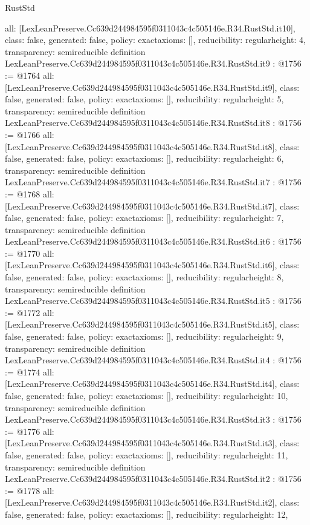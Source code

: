 \begin{lexlean}{RustStd}
\begin{coremodule}
{  all: [LexLeanPreserve.Cc639d244984595f0311043c4c505146e.R34.RustStd.it10],
  class: false,
  generated: false,
  policy: exact{axioms: []},
  reducibility: regular{height: 4},
  transparency: semireducible
}
definition LexLeanPreserve.Cc639d244984595f0311043c4c505146e.R34.RustStd.it9 : @1756 := @1764 {
  all: [LexLeanPreserve.Cc639d244984595f0311043c4c505146e.R34.RustStd.it9],
  class: false,
  generated: false,
  policy: exact{axioms: []},
  reducibility: regular{height: 5},
  transparency: semireducible
}
definition LexLeanPreserve.Cc639d244984595f0311043c4c505146e.R34.RustStd.it8 : @1756 := @1766 {
  all: [LexLeanPreserve.Cc639d244984595f0311043c4c505146e.R34.RustStd.it8],
  class: false,
  generated: false,
  policy: exact{axioms: []},
  reducibility: regular{height: 6},
  transparency: semireducible
}
definition LexLeanPreserve.Cc639d244984595f0311043c4c505146e.R34.RustStd.it7 : @1756 := @1768 {
  all: [LexLeanPreserve.Cc639d244984595f0311043c4c505146e.R34.RustStd.it7],
  class: false,
  generated: false,
  policy: exact{axioms: []},
  reducibility: regular{height: 7},
  transparency: semireducible
}
definition LexLeanPreserve.Cc639d244984595f0311043c4c505146e.R34.RustStd.it6 : @1756 := @1770 {
  all: [LexLeanPreserve.Cc639d244984595f0311043c4c505146e.R34.RustStd.it6],
  class: false,
  generated: false,
  policy: exact{axioms: []},
  reducibility: regular{height: 8},
  transparency: semireducible
}
definition LexLeanPreserve.Cc639d244984595f0311043c4c505146e.R34.RustStd.it5 : @1756 := @1772 {
  all: [LexLeanPreserve.Cc639d244984595f0311043c4c505146e.R34.RustStd.it5],
  class: false,
  generated: false,
  policy: exact{axioms: []},
  reducibility: regular{height: 9},
  transparency: semireducible
}
definition LexLeanPreserve.Cc639d244984595f0311043c4c505146e.R34.RustStd.it4 : @1756 := @1774 {
  all: [LexLeanPreserve.Cc639d244984595f0311043c4c505146e.R34.RustStd.it4],
  class: false,
  generated: false,
  policy: exact{axioms: []},
  reducibility: regular{height: 10},
  transparency: semireducible
}
definition LexLeanPreserve.Cc639d244984595f0311043c4c505146e.R34.RustStd.it3 : @1756 := @1776 {
  all: [LexLeanPreserve.Cc639d244984595f0311043c4c505146e.R34.RustStd.it3],
  class: false,
  generated: false,
  policy: exact{axioms: []},
  reducibility: regular{height: 11},
  transparency: semireducible
}
definition LexLeanPreserve.Cc639d244984595f0311043c4c505146e.R34.RustStd.it2 : @1756 := @1778 {
  all: [LexLeanPreserve.Cc639d244984595f0311043c4c505146e.R34.RustStd.it2],
  class: false,
  generated: false,
  policy: exact{axioms: []},
  reducibility: regular{height: 12},
}
\end{coremodule}
\end{lexlean}
